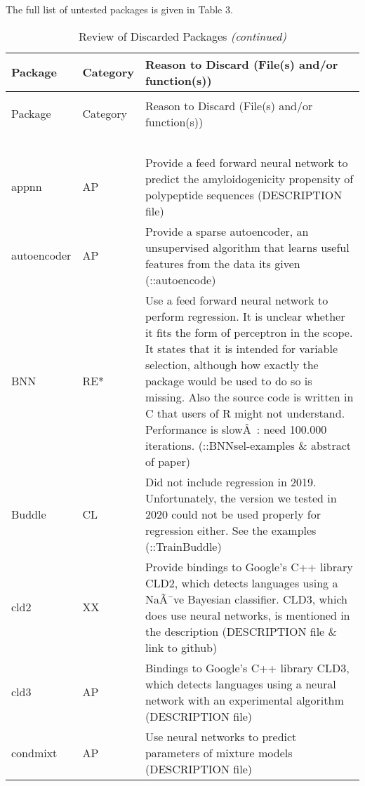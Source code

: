 The full list of untested packages is given in Table 3.

\begin{Schunk}
\begingroup\fontsize{7}{9}\selectfont

\begin{longtable}[t]{ll>{\raggedright\arraybackslash}p{10cm}}
\caption{\label{tab:unnamed-chunk-4}Review of Discarded Packages}\\
\toprule
Package & Category & Reason to Discard (File(s) and/or function(s))\\
\midrule
\endfirsthead
\caption[]{Review of Discarded Packages \textit{(continued)}}\\
\toprule
Package & Category & Reason to Discard (File(s) and/or function(s))\\
\midrule
\endhead
\
\endfoot
\bottomrule
\multicolumn{3}{l}{\textit{Note: } AP=Application, CL=Classification, RE=Regression, RE*=?, TS=Time serie, UT=Utility, XX=Other.}\\
\endlastfoot
appnn & AP & Provide a feed forward neural network to predict the amyloidogenicity propensity of polypeptide sequences (DESCRIPTION file)\\
autoencoder & AP & Provide a sparse autoencoder, an unsupervised algorithm that learns useful features from the data its given (::autoencode)\\
BNN & RE* & Use a feed forward neural network to perform regression. It is unclear whether it fits the form of perceptron in the scope. It states that it is intended for variable selection, although how exactly the package would be used to do so is missing. Also the source code is written in C that users of R might not understand. Performance is slowÂ : need 100.000 iterations. (::BNNsel-examples \& abstract of paper)\\
Buddle & CL & Did not include regression in 2019. Unfortunately, the version we tested in 2020 could not be used properly for regression either. See the examples (::TrainBuddle)\\
cld2 & XX & Provide bindings to Google's C++ library CLD2, which detects languages using a NaÃ¯ve Bayesian classifier. CLD3, which does use neural networks, is mentioned in the description (DESCRIPTION file \& link to github)\\
\addlinespace
cld3 & AP & Bindings to Google's C++ library CLD3, which detects languages using a neural network with an experimental algorithm (DESCRIPTION file)\\
condmixt & AP & Use neural networks to predict parameters of mixture models (DESCRIPTION file)\\

\end{longtable}
\end{Schunk}
